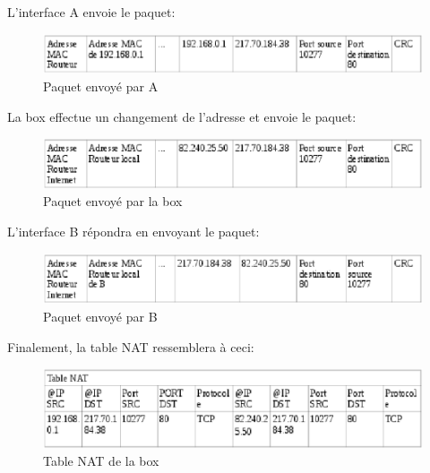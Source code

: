 L'interface A envoie le paquet:
\begin{figure}[h]
\centering
\includegraphics[width=12cm]{./pics/PaquetAR.eps}
\caption{Paquet envoyé par A}
\label{fig:paquetAR}
\end{figure}

La box effectue un changement de l'adresse et envoie le paquet:
\begin{figure}[h]
\centering
\includegraphics[width=12cm]{./pics/PaquetRB.eps}
\caption{Paquet envoyé par la box}
\label{fig:paquetRB}
\end{figure}

L'interface B répondra en envoyant le paquet:
\begin{figure}[h]
\centering
\includegraphics[width=12cm]{./pics/PaquetBR.eps}
\caption{Paquet envoyé par B}
\label{fig:paquetBR}
\end{figure}
\smallbreak
Finalement, la table NAT ressemblera à ceci:

\begin{figure}[h]
\centering
\includegraphics[width=12cm]{./pics/TableNAT1.eps}
\caption{Table NAT de la box}
\label{fig:NAT1}
\end{figure}

